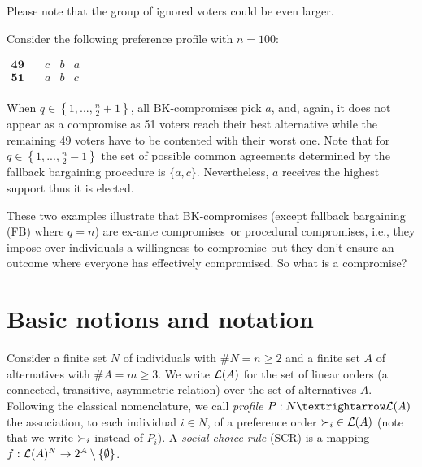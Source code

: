 \documentclass[version=3.21, pagesize, twoside=off, bibliography=totoc, DIV=calc, fontsize=12pt, a4paper]{scrartcl}
\begin{document}
\noindent Please note that the group of ignored voters could be even larger.
\begin{example}
	\label{ex:ex2}
	Consider the following preference profile with $n=100$:
	\begin{center}
		$
		\begin{array}{cccc}
		\mathbf{49} \quad &c&b&a\\
		\mathbf{51} \quad &a&b&c\\
		\end{array}
		$
	\end{center}
	When $q\in \left\{ 1,..., \frac{n}{2} +1\right\} $, all BK-compromises pick $a$, and, again, it does not appear as a compromise as 51 voters reach their best alternative while the remaining 49 voters have to be contented with their worst one. Note that for $q\in \left\{ 1,..., \frac{n}{2} -1 \right\} $ the set of possible common agreements determined by the fallback bargaining procedure is $\{a,c\}$. Nevertheless, $a$ receives the highest support thus it is elected.
\end{example}

These two examples illustrate that BK-compromises (except fallback bargaining (FB) where $q=n$) are \oquot ex-ante compromises\cquot \ or \oquot procedural compromises\cquot, i.e., they impose over individuals a willingness to compromise but they don't ensure an outcome where everyone has effectively compromised. So what is a compromise?


\section{Basic notions and notation}
\label{sec:notation}
Consider a finite set $N$ of individuals with $\#N=n\geq 2$ and a finite set $A$ of alternatives with $\#A=m\geq 3$. We write $\mathcal{L}(A)$ for the set of linear orders (a connected, transitive, asymmetric relation) over the set of alternatives $A$. 
Following the classical nomenclature, we call {\em profile} $P: N → \linors$ the association, to each individual $i \in N$, of a preference order ${\succ_i} \in \mathcal{L}(A)$ (note that we write ${\succ_i}$ instead of $P_i$). 
A \emph{social choice rule} (SCR) is a mapping $f:\mathcal{L}(A)^{N}\rightarrow 2^{A} \setminus \{\emptyset \}$. 
\end{document}
